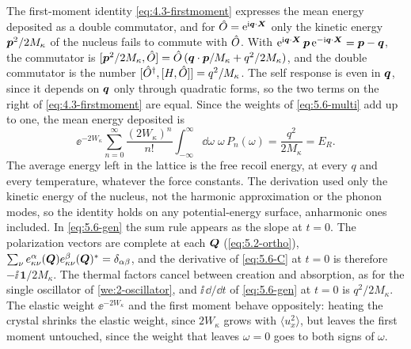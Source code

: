 The first-moment identity \cref{eq:4.3-firstmoment} expresses the mean energy deposited as a double commutator, and for $\hat{O} = \mathrm{e}^{\mathrm{i}\bm{q}\cdot\bm{X}}$ only the kinetic energy $\bm{p}^2/2M_\kappa$ of the nucleus fails to commute with $\hat{O}$. With $\mathrm{e}^{\mathrm{i}\bm{q}\cdot\bm{X}}\,\bm{p}\,\mathrm{e}^{-\mathrm{i}\bm{q}\cdot\bm{X}} = \bm{p} - \bm{q}$, the commutator is $[\bm{p}^2/2M_\kappa, \hat{O}] = \hat{O}\,(\bm{q}\cdot\bm{p}/M_\kappa + q^2/2M_\kappa)$, and the double commutator is the number $[\hat{O}^\dagger, [H, \hat{O}]] = q^2/M_\kappa$. The self response is even in $\bm{q}$, since it depends on $\bm{q}$ only through quadratic forms, so the two terms on the right of \cref{eq:4.3-firstmoment} are equal. Since the weights of \cref{eq:5.6-multi} add up to one, the mean energy deposited is
\begin{equation}
  \ee^{-2W_\kappa}\sum_{n=0}^{\infty}\frac{(2W_\kappa)^n}{n!}\int_{-\infty}^{\infty}\dd\omega\;\omega\,P_n(\omega) = \frac{q^2}{2M_\kappa} = E_R .
  \label{eq:5.6-sum}
\end{equation}
The average energy left in the lattice is the free recoil energy, at every $q$ and every temperature, whatever the force constants. The derivation used only the kinetic energy of the nucleus, not the harmonic approximation or the phonon modes, so the identity holds on any potential-energy surface, anharmonic ones included. In \cref{eq:5.6-gen} the sum rule appears as the slope at $t = 0$. The polarization vectors are complete at each $\bm{Q}$ (\cref{eq:5.2-ortho}), $\sum_\nu e^\alpha_{\kappa\nu}(\bm{Q})e^\beta_{\kappa\nu}(\bm{Q})^* = \delta_{\alpha\beta}$, and the derivative of \cref{eq:5.6-C} at $t = 0$ is therefore $-\ii\,\mathbf{1}/2M_\kappa$. The thermal factors cancel between creation and absorption, as for the single oscillator of \cref{we:2-oscillator}, and $\ii\,\dd/\dd t$ of \cref{eq:5.6-gen} at $t = 0$ is $q^2/2M_\kappa$. The elastic weight $\ee^{-2W_\kappa}$ and the first moment behave oppositely: heating the crystal shrinks the elastic weight, since $2W_\kappa$ grows with $\langle u_x^2\rangle$, but leaves the first moment untouched, since the weight that leaves $\omega = 0$ goes to both signs of $\omega$.

